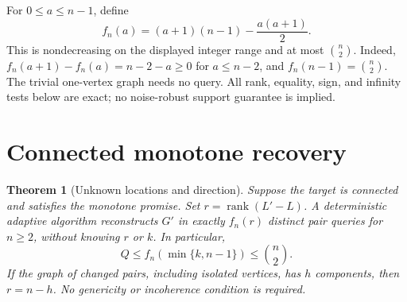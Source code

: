\documentclass[11pt,letterpaper]{article}
\newtheorem{theorem}{Theorem}
\newcommand{\rank}{\operatorname{rank}}
\begin{document}
For $0\le a\le n-1$, define
\[
 f_n(a)=(a+1)(n-1)-\frac{a(a+1)}2.
\]
This is nondecreasing on the displayed integer range and at most $\binom n2$. Indeed, $f_n(a+1)-f_n(a)=n-2-a\ge0$ for $a\le n-2$, and $f_n(n-1)=\binom n2$. The trivial one-vertex graph needs no query. All rank, equality, sign, and infinity tests below are exact; no noise-robust support guarantee is implied.

\section{Connected monotone recovery}
\begin{theorem}[Unknown locations and direction]\label{thm:connected}
Suppose the target is connected and satisfies the monotone promise. Set $r=\rank(L'-L)$. A deterministic adaptive algorithm reconstructs $G'$ in exactly $f_n(r)$ distinct pair queries for $n\ge2$, without knowing $r$ or $k$. In particular,
\[
 Q\le f_n(\min\{k,n-1\})\le\binom n2.
\]
If the graph of changed pairs, including isolated vertices, has $h$ components, then $r=n-h$. No genericity or incoherence condition is required.
\end{theorem}
\end{document}
